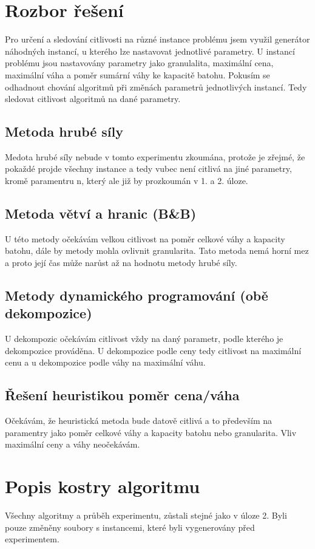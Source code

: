 \documentclass[11pt]{article}
\begin{document}
\section{Rozbor řešení}\label{kap:1}
Pro určení a sledování citlivosti na různé instance problému jsem využil generátor náhodných instancí, u kterého lze nastavovat jednotlivé parametry. U instancí problému jsou nastavovány parametry jako granulalita, maximální cena, maximální váha a poměr sumární váhy ke kapacitě batohu. Pokusím se odhadnout chování algoritmů při změnách parametrů jednotlivých instancí. Tedy sledovat citlivost algoritmů na dané parametry. 
\subsection{Metoda hrubé síly}
Medota hrubé síly nebude v tomto experimentu zkoumána, protože je zřejmé, že pokaždé projde všechny instance a tedy vubec není citlivá na jiné parametry, kromě paramentru n, který ale již by prozkoumán v 1. a 2. úloze.


\subsection{Metoda větví a hranic (B\&B)} 
U této metody očekávám velkou citlivost na poměr celkové váhy a kapacity batohu, dále by metody mohla ovlivnit granularita. Tato metoda nemá horní mez a proto její čas může narůst až na hodnotu metody hrubé síly. 

\subsection{Metody dynamického programování (obě dekompozice)}
U dekompozic očekávám citlivost vždy na daný parametr, podle kterého je dekompozice prováděna. U dekompozice podle ceny tedy citlivost na maximální cenu a u dekompozice podle váhy na maximální váhu. 

\subsection{Řešení heuristikou poměr cena/váha}
Očekávám, že heuristická metoda bude datově citlivá a to především na paramentry jako poměr celkové váhy a kapacity batohu nebo granularita. Vliv maximální ceny a váhy neočekávám.

\section{Popis kostry algoritmu}\label{kap:2}
Všechny algoritmy a průběh experimentu, zůstali stejné jako v úloze 2. Byli pouze změněny soubory s instancemi, které byli vygenerovány před experimentem.
\end{document}
